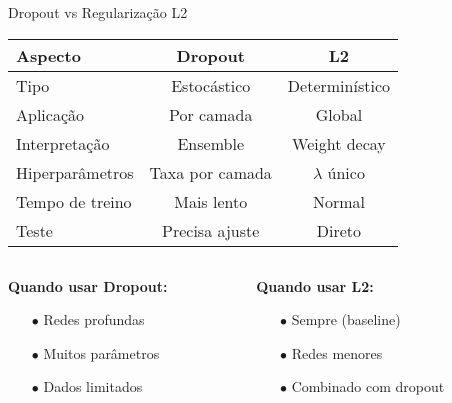 \documentclass[xcolor=dvipsnames,t,aspectratio=169]{beamer}
\begin{document}
\begin{frame}[c]{Dropout vs Regularização L2}
    \begin{center}
        \begin{tabular}{|l|c|c|}
            \hline
            \textbf{Aspecto} & \textbf{Dropout} & \textbf{L2} \\
            \hline
            \hline
            Tipo & Estocástico & Determinístico \\
            \hline
            Aplicação & Por camada & Global \\
            \hline
            Interpretação & Ensemble & Weight decay \\
            \hline
            Hiperparâmetros & Taxa por camada & $\lambda$ único \\
            \hline
            Tempo de treino & Mais lento & Normal \\
            \hline
            Teste & Precisa ajuste & Direto \\
            \hline
        \end{tabular}
    \end{center}
    
    \vspace{0.5cm}
    \begin{columns}[c]
        \begin{column}{0.5\textwidth}
            \textbf{Quando usar Dropout:}
            \begin{itemize}
                \item[$\bullet$] Redes profundas
                \item[$\bullet$] Muitos parâmetros
                \item[$\bullet$] Dados limitados
            \end{itemize}
        \end{column}
        \begin{column}{0.5\textwidth}
            \textbf{Quando usar L2:}
            \begin{itemize}
                \item[$\bullet$] Sempre (baseline)
                \item[$\bullet$] Redes menores
                \item[$\bullet$] Combinado com dropout
            \end{itemize}
        \end{column}
    \end{columns}
\end{frame}
\end{document}
